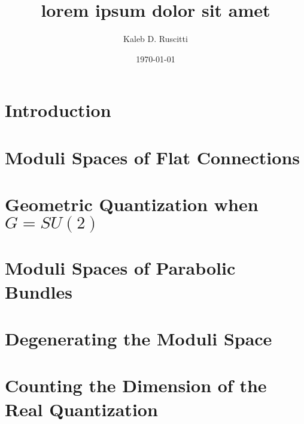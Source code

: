 \documentclass[]{report}
\title{lorem ipsum dolor sit amet}
\date{\today}
\author{Kaleb D. Ruscitti}
\begin{document}
\maketitle
\tableofcontents
\chapter{Introduction}
\label{s:intro}

\chapter{Moduli Spaces of Flat Connections}
\label{s:background}

\chapter{Geometric Quantization when $G=SU(2)$}
\label{s:jeffreyweitsman}

\chapter{Moduli Spaces of Parabolic Bundles}
\label{s:mastermoduli}

\chapter{Degenerating the Moduli Space}
\label{s:degeneration}

\chapter{Counting the Dimension of the Real Quantization}
\label{s:result}


\pagebreak
\printbibliography
\end{document}
